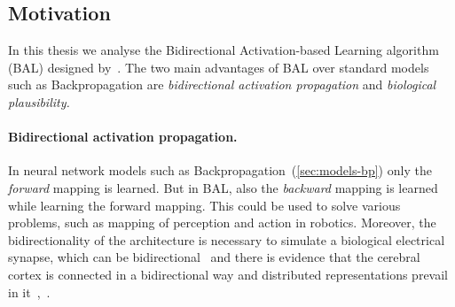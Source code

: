 




\subsection*{Motivation}
\label{sec:motivation} 
In this thesis we analyse the Bidirectional Activation-based Learning algorithm (BAL) designed by~\citet{farkas2013bal}. The two main advantages of BAL over standard models such as Backpropagation are \emph{bidirectional activation propagation} and \emph{biological plausibility.}

\paragraph{Bidirectional activation propagation.} In neural network models such as Backpropagation~(\ref{sec:models-bp}) only the \emph{forward} mapping is learned. But in BAL, also the \emph{backward} mapping is learned while learning the forward mapping. This could be used to solve various problems, such as mapping of perception and action in robotics. Moreover, the bidirectionality of the architecture is necessary to simulate a biological electrical synapse, which can be bidirectional~\citep{rosa2002biologically} and there is evidence that the cerebral cortex is connected in a bidirectional way and distributed representations prevail in it~\citep{o2000computational},~\citep{da2011advances}. 

